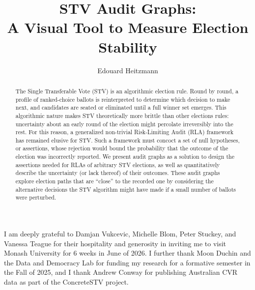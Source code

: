 \documentclass[runningheads]{llncs}
\begin{document}
%
\title{STV Audit Graphs: \\ A Visual Tool to Measure Election Stability}
%
%
%
\author{Edouard Heitzmann}
%
%
\maketitle              %
%
\begin{abstract}
The Single Transferable Vote (STV) is an algorithmic election rule. Round by round, a profile of ranked-choice ballots is reinterpreted to determine which decision to make next, and candidates are seated or eliminated until a full winner set emerges. This algorithmic nature makes STV theoretically more brittle than other elections rules: uncertainty about an early round of the election might percolate irreversibly into the rest. For this reason, a generalized non-trivial Risk-Limiting Audit (RLA) framework has remained elusive for STV. Such a framework must concoct a set of null hypotheses, or assertions, whose rejection would bound the probability that the outcome of the election was incorrectly reported. We present audit graphs as a solution to design the assertions needed for RLAs of arbitrary STV elections, as well as quantitatively describe the uncertainty (or lack thereof) of their outcomes. These audit graphs explore election paths that are ``close'' to the recorded one by considering the alternative decisions the STV algorithm might have made if a small number of ballots were perturbed.

\end{abstract}






\begin{credits}
\subsubsection{\ackname} I am deeply grateful to Damjan Vukcevic, Michelle Blom, Peter Stuckey, and Vanessa Teague for their hospitality and generosity in inviting me to visit Monash University for 6 weeks in June of 2026. I further thank Moon Duchin and the Data and Democracy Lab for funding my research for a formative semester in the Fall of 2025, and I thank Andrew Conway for publishing Australian CVR data as part of the ConcreteSTV project.
\end{credits}


%


%
\end{document}
